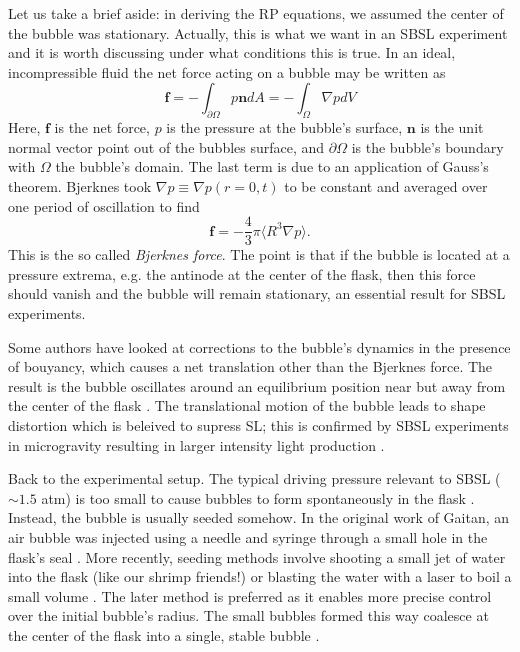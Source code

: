\documentclass[rmp,aps,nofootinbib,superscriptaddress,floatfix]{revtex4-2}
\begin{document}
Let us take a brief aside: in deriving the RP equations, we assumed the center of the bubble was stationary. Actually, this is what we want in an SBSL experiment and it is worth discussing under what conditions this is true. In an ideal, incompressible fluid the net force acting on a bubble may be written as 
\begin{equation}
    \bm{f}=-\int_{\partial \Omega} p \bm{n} dA = -\int_\Omega \nabla p dV
\end{equation}
Here, $\bm{f}$ is the net force, $p$ is the pressure at the bubble's surface, $\bm{n}$ is the unit normal vector point out of the bubbles surface, and $\partial \Omega$ is the bubble's boundary with $\Omega$ the bubble's domain. The last term is due to an application of Gauss's theorem. Bjerknes \cite{bjerknes1909kraftfelder} took $\nabla p \equiv \nabla p(r=0,t)$ to be constant and averaged over one period of oscillation to find 
\begin{equation}
    \bm{f} = -\frac{4}{3}\pi \langle R^3 \nabla p \rangle.
    \label{eq:Bj_force}
\end{equation}
This is the so called \emph{Bjerknes force}. The point is that if the bubble is located at a pressure extrema, e.g. the antinode at the center of the flask, then this force should vanish and the bubble will remain stationary, an essential result for SBSL experiments.

Some authors have looked at corrections to the bubble's dynamics in the presence of bouyancy, which causes a net translation other than the Bjerknes force. The result is the bubble oscillates around an equilibrium position near but away from the center of the flask \cite{matula2000single,matula1997bjerknes,matula1999inertial}. The translational motion of the bubble leads to shape distortion which is beleived to supress SL; this is confirmed by SBSL experiments in microgravity resulting in larger intensity light production \cite{matula2000single}.

Back to the experimental setup. The typical driving pressure relevant to SBSL ($\sim 1.5$ atm) is too small to cause bubbles to form spontaneously in the flask \cite{}. Instead, the bubble is usually seeded somehow. In the original work of Gaitan, an air bubble was injected using a needle and syringe through a small hole in the flask's seal \cite{gaitan1992sonoluminescence}. More recently, seeding methods involve shooting a small jet of water into the flask (like our shrimp friends!) or blasting the water with a laser to boil a small volume \cite{}. The later method is preferred as it enables more precise control over the initial bubble's radius. The small bubbles formed this way coalesce at the center of the flask into a single, stable bubble \cite{}.
\end{document}
